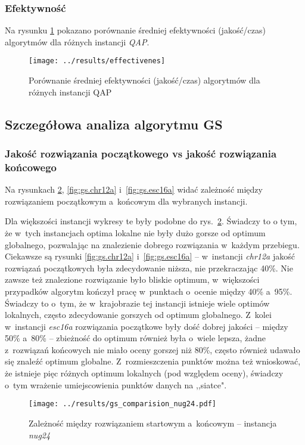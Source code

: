 \documentclass{article}
\begin{document}
		\subsubsection{Efektywność}Na rysunku \ref{fig:effectivenes} pokazano porównanie średniej efektywności (jakość/czas) algorytmów dla różnych instancji \emph{QAP}.
			\begin{figure}[h]
				\texttt{[image: ../results/effectivenes]}
				\caption{Porównanie średniej efektywności (jakość/czas) algorytmów dla różnych instancji QAP\label{fig:effectivenes}}
			\end{figure}


	\subsection{Szczegółowa analiza algorytmu GS}

		\subsubsection{Jakość rozwiązania początkowego vs jakość rozwiązania końcowego}
			Na rysunkach \ref{fig:gs.nug24}, \ref{fig:gs.chr12a} i~\ref{fig:gs.esc16a} widać zależność między rozwiązaniem początkowym a~końcowym dla wybranych instancji.
			
			Dla większości instancji wykresy te były podobne do rys.~\ref{fig:gs.nug24}. Świadczy to o tym, że w~tych instancjach optima lokalne nie były dużo gorsze od optimum globalnego, pozwalając na znalezienie dobrego rozwiązania w~każdym przebiegu. Ciekawsze są rysunki \ref{fig:gs.chr12a} i~\ref{fig:gs.esc16a} -- w~instancji \emph{chr12a} jakość rozwiązań początkowych była zdecydowanie niższa, nie przekraczając 40\%. Nie zawsze też znalezione rozwiązanie było bliskie optimum, w~większości przypadków algorytm kończył pracę w~punktach o~ocenie między 40\% a~95\%. Świadczy to o~tym, że w~krajobrazie tej instancji istnieje wiele optimów lokalnych, często zdecydowanie gorszych od optimum globalnego. Z~kolei w~instancji \emph{esc16a} rozwiązania początkowe były dość dobrej jakości -- między 50\% a~80\% -- zbieżność do optimum również była o~wiele lepsza, żadne z~rozwiązań końcowych nie miało oceny gorszej niż 80\%, często również udawało się znaleźć optimum globalne. Z~rozmieszczenia punktów można też wnioskować, że istnieje pięc różnych optimum lokalnych (pod względem oceny), świadczy o~tym wrażenie umiejscowienia punktów danych na ,,siatce".
			
			\begin{figure}[h]
				\texttt{[image: ../results/gs\_comparision\_nug24.pdf]}
				\caption{Zależność między rozwiązaniem startowym a~końcowym -- instancja \emph{nug24}\label{fig:gs.nug24}}				
			\end{figure}
			
\end{document}
